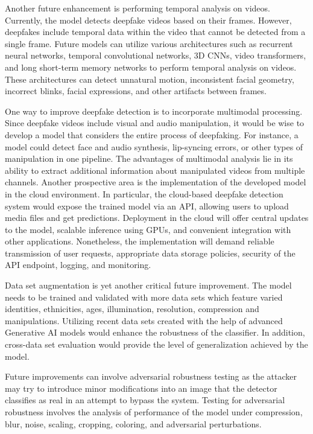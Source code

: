 \documentclass[12pt,a4paper]{report}
\begin{document}
Another future enhancement is performing temporal analysis on videos. Currently, the model detects deepfake videos based on their frames. However, deepfakes include temporal data within the video that cannot be detected from a single frame. Future models can utilize various architectures such as recurrent neural networks, temporal convolutional networks, 3D CNNs, video transformers, and long short-term memory networks to perform temporal analysis on videos. These architectures can detect unnatural motion, inconsistent facial geometry, incorrect blinks, facial expressions, and other artifacts between frames. 

One way to improve deepfake detection is to incorporate multimodal processing. Since deepfake videos include visual and audio manipulation, it would be wise to develop a model that considers the entire process of deepfaking. For instance, a model could detect face and audio synthesis, lip-syncing errors, or other types of manipulation in one pipeline. The advantages of multimodal analysis lie in its ability to extract additional information about manipulated videos from multiple channels.
Another prospective area is the implementation of the developed model in the cloud environment. In particular, the cloud-based deepfake detection system would expose the trained model via an API, allowing users to upload media files and get predictions. Deployment in the cloud will offer central updates to the model, scalable inference using GPUs, and convenient integration with other applications. Nonetheless, the implementation will demand reliable transmission of user requests, appropriate data storage policies, security of the API endpoint, logging, and monitoring.

Data set augmentation is yet another critical future improvement. The model needs to be trained and validated with more data sets which feature varied identities, ethnicities, ages, illumination, resolution, compression and manipulations. Utilizing recent data sets created with the help of advanced Generative AI models would enhance the robustness of the classifier. In addition, cross-data set evaluation would provide the level of generalization achieved by the model.

Future improvements can involve adversarial robustness testing as the attacker may try to introduce minor modifications into an image that the detector classifies as real in an attempt to bypass the system. Testing for adversarial robustness involves the analysis of performance of the model under compression, blur, noise, scaling, cropping, coloring, and adversarial perturbations.
\end{document}
